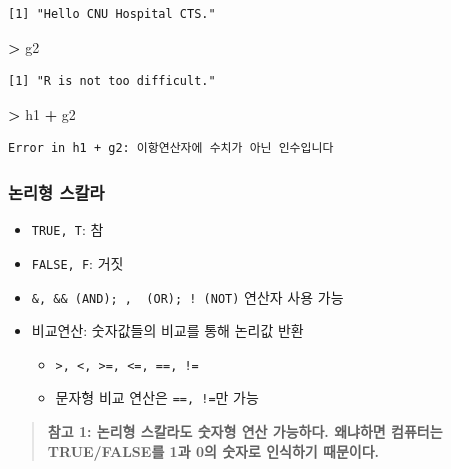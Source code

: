 \documentclass[11pt,a4paper]{book}
\newenvironment{Shaded}{\begin{snugshade}}{\end{snugshade}}
\newcommand{\StringTok}[1]{\textcolor[rgb]{0.31,0.60,0.02}{#1}}
\newcommand{\OperatorTok}[1]{\textcolor[rgb]{0.81,0.36,0.00}{\textbf{#1}}}
\newcommand{\NormalTok}[1]{#1}
\providecommand{\tightlist}{%
  \setlength{\itemsep}{0pt}\setlength{\parskip}{0pt}}
\theoremstyle{definition}
\theoremstyle{definition}
\theoremstyle{definition}
\theoremstyle{remark}
\begin{document}
\begin{verbatim}
[1] "Hello CNU Hospital CTS."
\end{verbatim}

\begin{Shaded}
\begin{Highlighting}[]
\OperatorTok{>}\StringTok{ }\NormalTok{g2}
\end{Highlighting}
\end{Shaded}

\begin{verbatim}
[1] "R is not too difficult."
\end{verbatim}

\begin{Shaded}
\begin{Highlighting}[]
\OperatorTok{>}\StringTok{ }\NormalTok{h1 }\OperatorTok{+}\StringTok{ }\NormalTok{g2}
\end{Highlighting}
\end{Shaded}

\begin{verbatim}
Error in h1 + g2: 이항연산자에 수치가 아닌 인수입니다
\end{verbatim}

\normalsize

\subsubsection{논리형 스칼라}\label{-}

\begin{itemize}
\tightlist
\item
  \texttt{TRUE,\ T}: 참
\item
  \texttt{FALSE,\ F}: 거짓
\item
  \texttt{\&,\ \&\&\ (AND);\ \textbar{},\ \textbar{}\textbar{}\ (OR);\ !\ (NOT)}
  연산자 사용 가능
\item
  비교연산: 숫자값들의 비교를 통해 논리값 반환

  \begin{itemize}
  \tightlist
  \item
    \texttt{\textgreater{},\ \textless{},\ \textgreater{}=,\ \textless{}=,\ ==,\ !=}
  \item
    문자형 비교 연산은 \texttt{==,\ !=}만 가능
  \end{itemize}
\end{itemize}

\begin{quote}
\textbf{참고 1: 논리형 스칼라도 숫자형 연산 가능하다. 왜냐하면 컴퓨터는
TRUE/FALSE를 1과 0의 숫자로 인식하기 때문이다.}
\end{quote}
\end{document}
